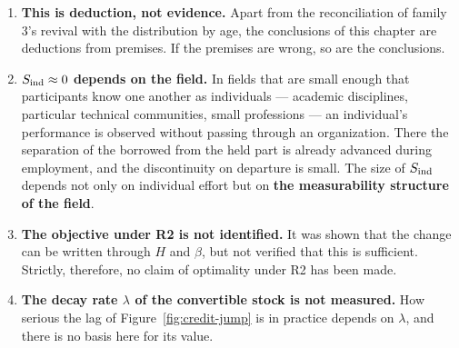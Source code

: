 \begin{enumerate}[label=(\arabic*)]
\item \textbf{This is deduction, not evidence.}
Apart from the reconciliation of family 3's revival with the distribution by age, the
conclusions of this chapter are deductions from premises. If the premises are wrong, so are
the conclusions.

\item \textbf{$S_{\rm ind}\approx 0$ depends on the field.}
In fields that are small enough that participants know one another as individuals ---
academic disciplines, particular technical communities, small professions --- an individual's
performance is observed without passing through an organization. There the separation of the
borrowed from the held part is already advanced during employment, and the discontinuity on
departure is small. The size of $S_{\rm ind}$ depends not only on individual effort but on
\textbf{the measurability structure of the field}.

\item \textbf{The objective under R2 is not identified.}
It was shown that the change can be written through $H$ and $\beta$, but not verified that
this is sufficient. Strictly, therefore, no claim of optimality under R2 has been made.

\item \textbf{The decay rate $\lambda$ of the convertible stock is not measured.}
How serious the lag of Figure~\ref{fig:credit-jump} is in practice depends on $\lambda$, and
there is no basis here for its value.
\end{enumerate}
